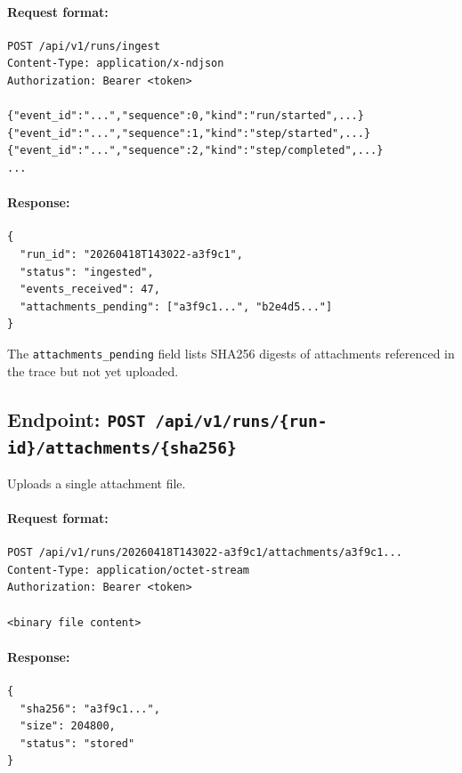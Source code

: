 \paragraph{Request format:}

\begin{verbatim}
POST /api/v1/runs/ingest
Content-Type: application/x-ndjson
Authorization: Bearer <token>

{"event_id":"...","sequence":0,"kind":"run/started",...}
{"event_id":"...","sequence":1,"kind":"step/started",...}
{"event_id":"...","sequence":2,"kind":"step/completed",...}
...
\end{verbatim}

\paragraph{Response:}

\begin{verbatim}
{
  "run_id": "20260418T143022-a3f9c1",
  "status": "ingested",
  "events_received": 47,
  "attachments_pending": ["a3f9c1...", "b2e4d5..."]
}
\end{verbatim}

The \texttt{attachments\_pending} field lists SHA256 digests of attachments referenced in the trace but not yet uploaded.

\subsection{Endpoint: \texttt{POST /api/v1/runs/\{run-id\}/attachments/\{sha256\}}}

Uploads a single attachment file.

\paragraph{Request format:}

\begin{verbatim}
POST /api/v1/runs/20260418T143022-a3f9c1/attachments/a3f9c1...
Content-Type: application/octet-stream
Authorization: Bearer <token>

<binary file content>
\end{verbatim}

\paragraph{Response:}

\begin{verbatim}
{
  "sha256": "a3f9c1...",
  "size": 204800,
  "status": "stored"
}
\end{verbatim}

